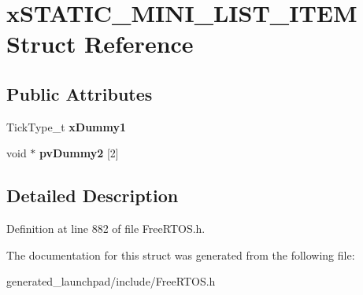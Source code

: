 \hypertarget{structxSTATIC__MINI__LIST__ITEM}{}\section{x\+S\+T\+A\+T\+I\+C\+\_\+\+M\+I\+N\+I\+\_\+\+L\+I\+S\+T\+\_\+\+I\+T\+EM Struct Reference}
\label{structxSTATIC__MINI__LIST__ITEM}
\subsection*{Public Attributes}
\begin{DoxyCompactItemize}
\item 
\mbox{\label{structxSTATIC__MINI__LIST__ITEM_a43efd282907e8243bca29338d55dbefa}} 
Tick\+Type\+\_\+t {\bfseries x\+Dummy1}
\item 
\mbox{\label{structxSTATIC__MINI__LIST__ITEM_a384ac285efb6edf346f260bdc09ccac6}} 
void $\ast$ {\bfseries pv\+Dummy2} \mbox{[}2\mbox{]}
\end{DoxyCompactItemize}


\subsection{Detailed Description}


Definition at line 882 of file Free\+R\+T\+O\+S.\+h.



The documentation for this struct was generated from the following file\+:\begin{DoxyCompactItemize}
\item 
generated\+\_\+launchpad/include/Free\+R\+T\+O\+S.\+h\end{DoxyCompactItemize}
